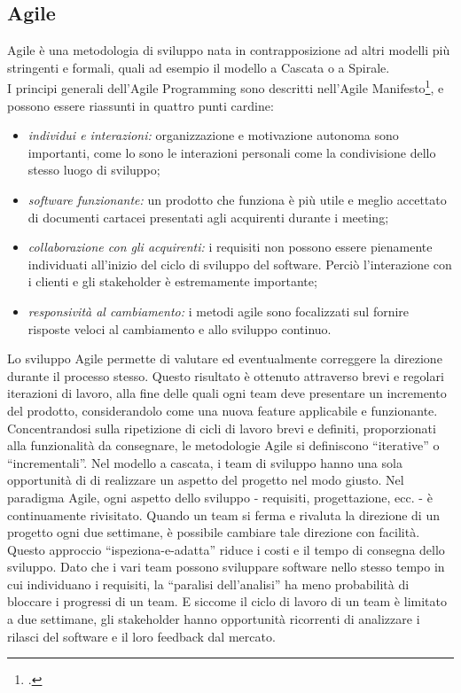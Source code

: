 \subsection{Agile}
Agile è una metodologia di sviluppo nata in contrapposizione ad altri modelli più stringenti e formali, quali ad esempio il modello a Cascata o a Spirale.\\
I principi generali dell’Agile Programming sono descritti nell’Agile Manifesto\footcite{site:agile-manifesto}, e possono essere riassunti in quattro punti cardine:
\begin{itemize}
	\item \emph{individui e interazioni:} organizzazione e motivazione autonoma sono importanti, come lo sono le interazioni personali come la condivisione dello stesso luogo di sviluppo;
	\item \emph{software funzionante:} un prodotto che funziona è più utile e meglio accettato di documenti cartacei presentati agli acquirenti durante i meeting;
	\item \emph{collaborazione con gli acquirenti:} i requisiti non possono essere pienamente individuati all’inizio del ciclo di sviluppo del software. Perciò l’interazione con i clienti e gli stakeholder è estremamente importante;
	\item \emph{responsività al cambiamento:} i metodi agile sono focalizzati sul fornire risposte veloci al cambiamento e allo sviluppo continuo.
\end{itemize}
Lo sviluppo Agile permette di valutare ed eventualmente correggere la direzione durante il processo stesso. Questo risultato è ottenuto attraverso brevi e regolari iterazioni di lavoro, alla fine delle quali ogni team deve presentare un incremento del prodotto, considerandolo come una nuova feature applicabile e funzionante. Concentrandosi sulla ripetizione di cicli di lavoro brevi e definiti, proporzionati alla funzionalità da consegnare, le metodologie Agile si definiscono “iterative” o “incrementali”. Nel modello a cascata, i team di sviluppo hanno una sola opportunità di di realizzare un aspetto del progetto nel modo giusto. Nel paradigma Agile, ogni aspetto dello sviluppo - requisiti, progettazione, ecc. - è continuamente rivisitato. Quando un team si ferma e rivaluta la direzione di un progetto ogni due settimane, è possibile cambiare tale direzione con facilità.\\
Questo approccio “ispeziona-e-adatta” riduce i costi e il tempo di consegna dello sviluppo. Dato che i vari team possono sviluppare software nello stesso tempo in cui individuano i requisiti, la “paralisi dell’analisi” ha meno probabilità di bloccare i progressi di un team. E siccome il ciclo di lavoro di un team è limitato a due settimane, gli stakeholder hanno opportunità ricorrenti di analizzare i rilasci del software e il loro feedback dal mercato.

